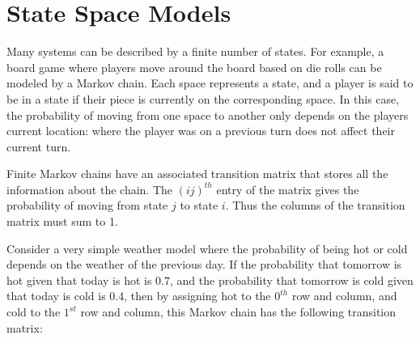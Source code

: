 \label{lab:Markov}


\section*{State Space Models} %

Many systems can be described by a finite number of states.
For example, a board game where players move around the board based on die rolls can be modeled by a Markov chain.
Each space represents a state, and a player is said to be in a state if their piece is currently on the corresponding space.
In this case, the probability of moving from one space to another only depends on the players current location: where the player was on a previous turn does not affect their current turn.

Finite Markov chains have an associated transition matrix that stores all the information about the chain.
The $(ij)^{th}$ entry of the matrix gives the probability of moving from state $j$ to state $i$.
Thus the columns of the transition matrix must sum to 1. %

Consider a very simple weather model where the probability of being hot or cold depends on the weather of the previous day.
If the probability that tomorrow is hot given that today is hot is 0.7, and the probability that tomorrow is cold given that today is cold is 0.4, then by assigning hot to the $0^{th}$ row and column, and cold to the $1^{st}$ row and column, this Markov chain has the following transition matrix:

